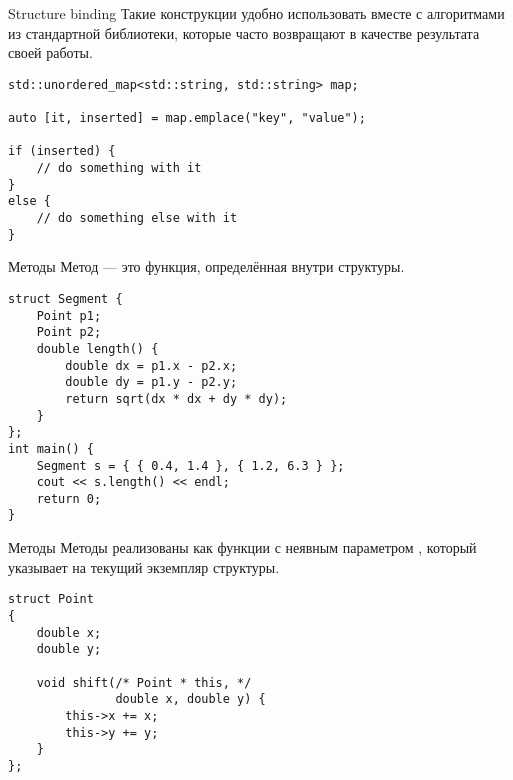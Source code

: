 \documentclass{beamer}
\begin{document}

\begin{frame}[fragile]{Structure binding}
    Такие конструкции удобно использовать вместе с алгоритмами из стандартной библиотеки, 
        которые часто возвращают  в качестве результата своей работы.
    \begin{lstlisting}
std::unordered_map<std::string, std::string> map;

auto [it, inserted] = map.emplace("key", "value");

if (inserted) {
    // do something with it
}
else {
    // do something else with it
}
    \end{lstlisting}
\end{frame}

\begin{frame}[fragile]{Методы}
    Метод — это функция, определённая внутри структуры.
\small
    \begin{lstlisting}
struct Segment {
    Point p1;
    Point p2;
    double length() {
        double dx = p1.x - p2.x;
        double dy = p1.y - p2.y;
        return sqrt(dx * dx + dy * dy);
    }
};
int main() {
    Segment s = { { 0.4, 1.4 }, { 1.2, 6.3 } };
    cout << s.length() << endl;
    return 0;
}
    \end{lstlisting}
\end{frame}

\begin{frame}[fragile]{Методы}
    Методы реализованы как функции с неявным параметром ,
    который указывает на текущий экземпляр структуры.
    \small
    \begin{lstlisting}
struct Point 
{
    double x;
    double y;

    void shift(/* Point * this, */
               double x, double y) {
        this->x += x;
        this->y += y;        
    }
};
    \end{lstlisting}
\end{frame}
\end{document}
